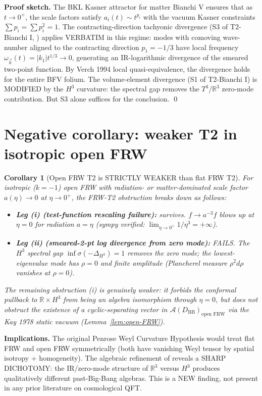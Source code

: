 \documentclass[11pt,a4paper]{article}
\newtheorem{corollary}[theorem]{Corollary}
\theoremstyle{definition}
\newcommand{\AA}{\mathcal{A}}
\newcommand{\BB}{\mathrm{BB}}
\newcommand{\R}{\mathbb{R}}
\begin{document}
\textbf{Proof sketch.} The BKL Kasner attractor for matter Bianchi V
ensures that as $t\to 0^+$, the scale factors satisfy
$a_i(t)\sim t^{p_i}$ with the vacuum Kasner constraints
$\sum p_i = \sum p_i^2 = 1$. The contracting-direction tachyonic
divergence (S3 of T2-Bianchi I, \cite[Section 2(ii)]{RemondiereOpusBI})
applies VERBATIM in this regime: modes with comoving wave-number aligned
to the contracting direction $p_1=-1/3$ have local frequency
$\omega_{\vec k}(t)=|k_1|t^{1/3}\to 0$, generating an IR-logarithmic
divergence of the smeared two-point function. By Verch 1994 local
quasi-equivalence, the divergence holds for the entire BFV folium.
The volume-element divergence (S1 of T2-Bianchi I) is MODIFIED by the
$H^3$ curvature: the spectral gap removes the $T^3$/$\R^3$ zero-mode
contribution. But S3 alone suffices for the conclusion. \qed

\section{Negative corollary: weaker T2 in isotropic open FRW}

\begin{corollary}[Open FRW T2 is STRICTLY WEAKER than flat FRW T2]\label{cor:openFRW}
For isotropic ($k=-1$) open FRW with radiation- or matter-dominated scale
factor $a(\eta)\to 0$ at $\eta\to 0^+$, the FRW-T2 obstruction breaks
down as follows:
\begin{itemize}
  \item \textbf{Leg (i) (test-function rescaling failure):} survives.
  $f\to a^{-3}f$ blows up at $\eta=0$ for radiation $a=\eta$
  (sympy verified: $\lim_{\eta\to 0^+}1/\eta^3 = +\infty$).
  \item \textbf{Leg (ii) (smeared-2-pt log divergence from zero mode):}
  FAILS. The $H^3$ spectral gap $\inf\sigma(-\Delta_{H^3})=1$ removes
  the zero mode; the lowest-eigenvalue mode has $\rho=0$ and finite
  amplitude (Plancherel measure $\rho^2 d\rho$ vanishes at $\rho=0$).
\end{itemize}
The remaining obstruction (i) is genuinely weaker: it forbids the
conformal pullback to $\R\times H^3$ from being an algebra isomorphism
through $\eta=0$, but does not obstruct the existence of a
cyclic-separating vector in $\AA(D_\BB)_{\text{open FRW}}$ via the
Kay 1978 static vacuum (Lemma~\ref{lem:open-FRW}).
\end{corollary}

\textbf{Implications.} The original Penrose Weyl Curvature Hypothesis
\cite{Penrose1979} would treat flat FRW and open FRW symmetrically (both
have vanishing Weyl tensor by spatial isotropy + homogeneity). The
algebraic refinement of \cite{Remondiere2026FRW} reveals a SHARP
DICHOTOMY: the IR/zero-mode structure of $\R^3$ versus $H^3$ produces
qualitatively different past-Big-Bang algebras. This is a NEW finding,
not present in any prior literature on cosmological QFT.
\end{document}
